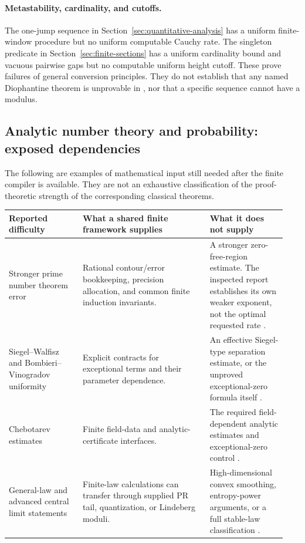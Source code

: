 \paragraph{Metastability, cardinality, and cutoffs.}
The one-jump sequence in Section~\ref{sec:quantitative-analysis} has a
uniform finite-window procedure but no uniform computable Cauchy rate.
The singleton predicate in Section~\ref{sec:finite-sections} has a
uniform cardinality bound and vacuous pairwise gaps but no computable
uniform height cutoff. These prove failures of general conversion
principles. They do not establish that any named Diophantine theorem is
unprovable in \iPRA, nor that a specific sequence cannot have a modulus.

\subsection{Analytic number theory and probability: exposed dependencies}

The following are examples of mathematical input still needed after the
finite compiler is available. They are not an exhaustive classification
of the proof-theoretic strength of the corresponding classical theorems.

\begin{longtable}{@{}>{\raggedright\arraybackslash}p{0.25\linewidth}>{\raggedright\arraybackslash}p{0.43\linewidth}>{\raggedright\arraybackslash}p{0.26\linewidth}@{}}
\toprule
Reported difficulty & What a shared finite framework supplies & What it does not supply\\
\midrule
\endhead
Stronger prime number theorem error & Rational contour/error bookkeeping,
precision allocation, and common finite induction invariants. & A
stronger zero-free-region estimate. The inspected report establishes its
own weaker exponent, not the optimal requested rate \cite{repo-pnt}.\\[5pt]
Siegel--Walfisz and Bombieri--Vinogradov uniformity & Explicit contracts
for exceptional terms and their parameter dependence. & An effective
Siegel-type separation estimate, or the unproved exceptional-zero formula
itself \cite{repo-prime-sw}.\\[5pt]
Chebotarev estimates & Finite field-data and analytic-certificate
interfaces. & The required field-dependent analytic estimates and
exceptional-zero control \cite{repo-chebotarev}.\\[5pt]
General-law and advanced central limit statements & Finite-law
calculations can transfer through supplied PR tail, quantization, or
Lindeberg moduli. & High-dimensional convex smoothing, entropy-power
arguments, or a full stable-law classification \cite{repo-clt}.\\
\bottomrule
\end{longtable}


